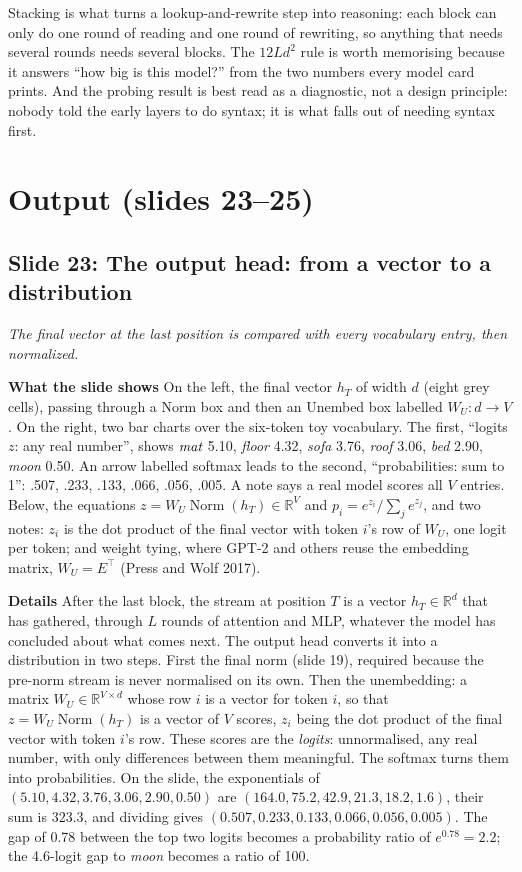 \documentclass[11pt,letterpaper]{article}
\newcommand{\setstage}[1]{\colorlet{stagec}{#1}}
\newcommand{\slide}[3]{%
  \subsection[Slide #1: #2]{Slide #1: #2}%
  {\color{muted}\itshape #3\par}\medskip}
\newcommand{\para}[1]{\medskip\noindent\textbf{#1}\quad}
\newenvironment{intuition}{\begin{tcolorbox}[intuitionbox]}{\end{tcolorbox}}
\DeclareMathOperator{\Norm}{Norm}
\begin{document}
\begin{intuition}
Stacking is what turns a lookup-and-rewrite step into reasoning: each block can only do one round of reading and one round of rewriting, so anything that needs several rounds needs several blocks. The $12Ld^2$ rule is worth memorising because it answers ``how big is this model?'' from the two numbers every model card prints. And the probing result is best read as a diagnostic, not a design principle: nobody told the early layers to do syntax; it is what falls out of needing syntax first.
\end{intuition}

\setstage{outc}
\section{Output (slides 23--25)}

\slide{23}{The output head: from a vector to a distribution}{The final vector at the last position is compared with every vocabulary entry, then normalized.}

\para{What the slide shows} On the left, the final vector $h_T$ of width $d$ (eight grey cells), passing through a Norm box and then an Unembed box labelled $W_U\colon d\to V$. On the right, two bar charts over the six-token toy vocabulary. The first, ``logits $z$: any real number'', shows $\emph{mat}$ 5.10, \emph{floor} 4.32, \emph{sofa} 3.76, \emph{roof} 3.06, \emph{bed} 2.90, \emph{moon} 0.50. An arrow labelled softmax leads to the second, ``probabilities: sum to 1'': .507, .233, .133, .066, .056, .005. A note says a real model scores all $V$ entries. Below, the equations $z=W_U\Norm(h_T)\in\mathbb{R}^V$ and $p_i=e^{z_i}/\sum_je^{z_j}$, and two notes: $z_i$ is the dot product of the final vector with token $i$'s row of $W_U$, one logit per token; and weight tying, where GPT-2 and others reuse the embedding matrix, $W_U=E^{\top}$ (Press and Wolf 2017).

\para{Details} After the last block, the stream at position $T$ is a vector $h_T\in\mathbb{R}^d$ that has gathered, through $L$ rounds of attention and MLP, whatever the model has concluded about what comes next. The output head converts it into a distribution in two steps. First the final norm (slide 19), required because the pre-norm stream is never normalised on its own. Then the unembedding: a matrix $W_U\in\mathbb{R}^{V\times d}$ whose row $i$ is a vector for token $i$, so that $z=W_U\Norm(h_T)$ is a vector of $V$ scores, $z_i$ being the dot product of the final vector with token $i$'s row. These scores are the \emph{logits}: unnormalised, any real number, with only differences between them meaningful. The softmax turns them into probabilities. On the slide, the exponentials of $(5.10,4.32,3.76,3.06,2.90,0.50)$ are $(164.0,75.2,42.9,21.3,18.2,1.6)$, their sum is $323.3$, and dividing gives $(0.507,0.233,0.133,0.066,0.056,0.005)$. The gap of 0.78 between the top two logits becomes a probability ratio of $e^{0.78}=2.2$; the 4.6-logit gap to \emph{moon} becomes a ratio of 100.
\end{document}

